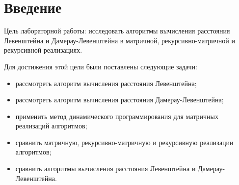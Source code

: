 \section*{Введение}

\hspace{1.25cm}
Цель лабораторной работы: исследовать алгоритмы вычисления расстояния Левенштейна и Дамерау-Левенштейна в матричной, рекурсивно-матричной и рекурсивной реализациях.

\vspace{0.25cm}
Для достижения этой цели были поставлены следующие задачи:

\begin{itemize}

\item рассмотреть алгоритм вычисления расстояния Левенштейна;

\item рассмотреть алгоритм вычисления расстояния Дамерау-Левенштейна;

\item применить метод динамического программирования для матричных реализаций алгоритмов;

\item сравнить матричную, рекурсивно-матричную и рекурсивную реализации алгоритмов;

\item сравнить алгоритмы вычисления расстояния Левенштейна и Дамерау-Левенштейна.

\end{itemize}

\newpage